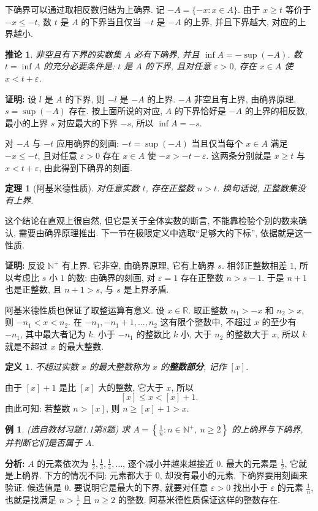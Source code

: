 \documentclass[UTF8,openany]{ctexbook}
\theoremstyle{chinesetextbook}
\newtheorem{definition}{定义}[section]
\newtheorem{example}{例}[section]
\newtheorem{theorem}{定理}[section]
\newenvironment{cnproof}{\par\indent\textbf{证明:} \ignorespaces}{\par}
\newtheorem*{corollarysingle}{推论}
\begin{document}
下确界可以通过取相反数归结为上确界. 记 $-A=\{-x:x\in A\}$. 由于 $x\ge t$ 等价于 $-x\le-t$, 数 $t$ 是 $A$ 的下界当且仅当 $-t$ 是 $-A$ 的上界, 并且下界越大, 对应的上界越小.
\begin{corollarysingle}
非空且有下界的实数集 $A$ 必有下确界, 并且 $\inf A=-\sup(-A)$. 数 $t=\inf A$ 的充分必要条件是: $t$ 是 $A$ 的下界, 且对任意 $\varepsilon>0$, 存在 $x\in A$ 使 $x<t+\varepsilon$.
\end{corollarysingle}
\begin{cnproof}
设 $l$ 是 $A$ 的下界, 则 $-l$ 是 $-A$ 的上界. $-A$ 非空且有上界, 由确界原理, $s=\sup(-A)$ 存在. 按上面所说的对应, $A$ 的下界恰好是 $-A$ 的上界的相反数, 最小的上界 $s$ 对应最大的下界 $-s$, 所以 $\inf A=-s$.

对 $-A$ 与 $-t$ 应用确界的刻画: $-t=\sup(-A)$ 当且仅当每个 $x\in A$ 满足 $-x\le-t$, 且对任意 $\varepsilon>0$ 存在 $x\in A$ 使 $-x>-t-\varepsilon$. 这两条分别就是 $x\ge t$ 与 $x<t+\varepsilon$, 由此得到下确界的刻画.
\end{cnproof}
\begin{theorem}[阿基米德性质]
对任意实数 $t$, 存在正整数 $n>t$. 换句话说, 正整数集没有上界.
\end{theorem}
这个结论在直观上很自然, 但它是关于全体实数的断言, 不能靠检验个别的数来确认, 需要由确界原理推出. 下一节在极限定义中选取“足够大的下标”, 依据就是这一性质.
\begin{cnproof}
反设 $\mathbb N^+$ 有上界. 它非空, 由确界原理, 它有上确界 $s$. 相邻正整数相差 $1$, 所以考虑比 $s$ 小 $1$ 的数: 由确界的刻画, 对 $\varepsilon=1$ 存在正整数 $n>s-1$. 于是 $n+1$ 也是正整数, 且 $n+1>s$, 与 $s$ 是上界矛盾.
\end{cnproof}
阿基米德性质也保证了取整运算有意义. 设 $x\in\mathbb R$. 取正整数 $n_1>-x$ 和 $n_2>x$, 则 $-n_1<x<n_2$. 在 $-n_1,-n_1+1,\ldots,n_2$ 这有限个整数中, 不超过 $x$ 的至少有 $-n_1$, 其中最大者记为 $k$. 小于 $-n_1$ 的整数比 $k$ 小, 大于 $n_2$ 的整数大于 $x$, 所以 $k$ 就是不超过 $x$ 的最大整数.
\begin{definition}
不超过实数 $x$ 的最大整数称为 $x$ 的\textbf{整数部分}, 记作 $[x]$.
\end{definition}
由于 $[x]+1$ 是比 $[x]$ 大的整数, 它大于 $x$, 所以
\[
[x]\le x<[x]+1.
\]
由此可知: 若整数 $n>[x]$, 则 $n\ge[x]+1>x$.
\begin{example}
\textnormal{(选自教材习题1.1第8题)} 求 $\displaystyle A=\left\{\frac1n:n\in\mathbb N^+,\ n\ge2\right\}$ 的上确界与下确界, 并判断它们是否属于 $A$.
\end{example}
\par\indent\textbf{分析:} $A$ 的元素依次为 $\displaystyle\frac12,\frac13,\frac14,\ldots$, 逐个减小并越来越接近 $0$. 最大的元素是 $\displaystyle\frac12$, 它就是上确界. 下方的情况不同: 元素都大于 $0$, 却没有最小的元素, 下确界要用刻画来验证. 候选值是 $0$. 要说明它是最大的下界, 就要对任意 $\varepsilon>0$ 找出小于 $\varepsilon$ 的元素 $\displaystyle\frac1n$, 也就是找满足 $\displaystyle n>\frac1\varepsilon$ 且 $n\ge2$ 的整数. 阿基米德性质保证这样的整数存在.
\end{document}
